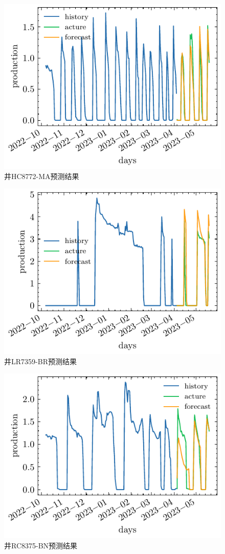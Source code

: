 \begin{figure}[H]
    \centering
    \includegraphics[width=.9\linewidth]{figure/forecast_SN0075-04ST.pdf}
    \caption{井HC8772-MA预测结果}
\end{figure}
\begin{figure}[H]
    \centering
    \includegraphics[width=.9\linewidth]{figure/forecast_SN0087-03i.pdf}
    \caption{井LR7359-BR预测结果}
\end{figure}
\begin{figure}[H]
    \centering
    \includegraphics[width=.9\linewidth]{figure/forecast_SN0095-06.pdf}
    \caption{井RC8375-BN预测结果}
\end{figure}
